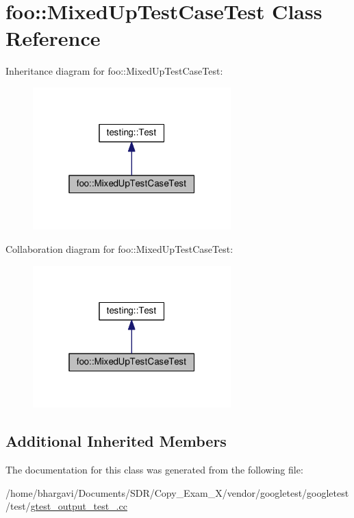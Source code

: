 \hypertarget{classfoo_1_1_mixed_up_test_case_test}{}\section{foo\+:\+:Mixed\+Up\+Test\+Case\+Test Class Reference}
\label{classfoo_1_1_mixed_up_test_case_test}


Inheritance diagram for foo\+:\+:Mixed\+Up\+Test\+Case\+Test\+:
\nopagebreak
\begin{figure}[H]
\begin{center}
\leavevmode
\includegraphics[width=217pt]{classfoo_1_1_mixed_up_test_case_test__inherit__graph}
\end{center}
\end{figure}


Collaboration diagram for foo\+:\+:Mixed\+Up\+Test\+Case\+Test\+:
\nopagebreak
\begin{figure}[H]
\begin{center}
\leavevmode
\includegraphics[width=217pt]{classfoo_1_1_mixed_up_test_case_test__coll__graph}
\end{center}
\end{figure}
\subsection*{Additional Inherited Members}


The documentation for this class was generated from the following file\+:\begin{DoxyCompactItemize}
\item 
/home/bhargavi/\+Documents/\+S\+D\+R/\+Copy\+\_\+\+Exam\+\_\+X/vendor/googletest/googletest/test/\hyperlink{gtest__output__test___8cc}{gtest\+\_\+output\+\_\+test\+\_\+.\+cc}\end{DoxyCompactItemize}
